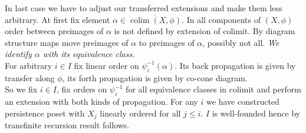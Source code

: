\begin{pf}
  In last case we have to adjust our transferred extensions and make them less arbitrary. At first fix element $\alpha \in \overline{\operatorname{colim}(X, \phi)}$. In all components of $(X,\phi)$ order between preimages of $\alpha$ is not defined by extension of colimit. By diagram structure maps move preimages of $\alpha$ to preimages of $\alpha$, possibly not all. \textit{We identify $\alpha$ with its equivalence class.}\\

  For arbitrary $i \in I$ fix linear order on $\psi_i^{-1}(\alpha)$. Its back propagation is given by transfer along $\phi$, its forth propagation is given by co-cone diagram.\\

  So we fix $i \in I$, fix orders on $\psi_i^{-1}$ for all equivalence classes in colimit and perform an extension with both kinds of propagation. For any $i$ we have constructed persistence poset with $X_j$ linearly ordered for all $j \leq i$. $I$ is well-founded hence by transfinite recursion result follows.
\end{pf}

%
%
%
